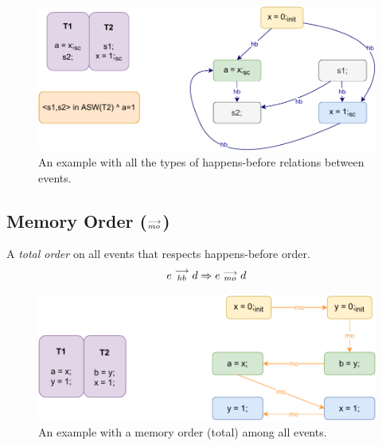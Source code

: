         \begin{figure}[H]
            \centering
            \includegraphics[scale=0.7]{ECMAScriptMemoryModel/Happens-before.pdf}
            \caption{An example with all the types of happens-before relations between events.}
        \end{figure}
    
    \subsection{Memory Order ($\stackrel{\longrightarrow}{_{mo}}$)}
        A \textit{total order} on all events that respects happens-before order. 
        \begin{align*}
            e\stackrel{\longrightarrow}{_{hb}}d \Rightarrow{} e\stackrel{\longrightarrow}{_{mo}}d    
        \end{align*}
        
        \begin{figure}[H]
            \centering
            \includegraphics[scale=0.7]{ECMAScriptMemoryModel/MemoryOrder.pdf}
            \caption{An example with a memory order (total) among all events.}
        \end{figure}

